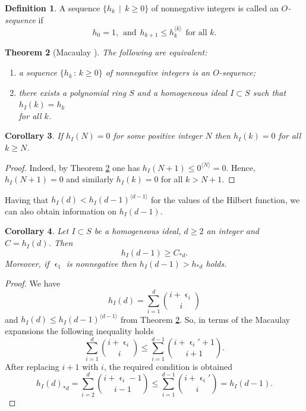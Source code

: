\documentclass[a4paper,11pt,english,german]{amsart}
\DeclareMathOperator{\eps}{\epsilon}
\newtheorem{thm}{Theorem}[section]
\newtheorem{cor}[thm]{Corollary}
\theoremstyle{definition}
\newtheorem{Def}[thm]{Definition}
\begin{document}
\begin{Def}
A sequence $\{h_k \, \mid\,k\geqslant 0\}$ of nonnegative integers is called an \emph{$O$-sequence} if 
\begin{equation*}
	h_0=1,\hspace{5pt}\text{and}\hspace{5pt} h_{k+1}\leqslant h_k^{\langle k\rangle}\hspace{5pt}\text{for all }k.
\end{equation*}	
\end{Def}


\begin{thm}[Macaulay \cite{macaulay1927some}] \label{macaulay}
	The following are equivalent:
	\begin{enumerate}
		\item[\emph{(1)}] a sequence $\{h_k \,:\,k\geqslant 0\}$ of nonnegative integers is an $O$-sequence;
		\item[\emph{(2)}] there exists a polynomial ring $S$ and a homogeneous ideal $I\subset S$ such that $h_I(k)=h_k$ \\for all $k$.
	\end{enumerate}
\end{thm}
\begin{cor}\label{macaulay_zero}
If $h_I(N)=0$ for some positive integer $N$ then $h_I(k)=0$ for all $k\geqslant N$.	
\end{cor}
\begin{proof}
	Indeed, by Theorem \ref{macaulay} one has $h_I(N+1)\leqslant 0^{\langle N\rangle}=0$. Hence, $h_I(N+1)=0$ and similarly $h_I(k)=0$ for all $k>N+1$.
\end{proof}


Having that $h_I(d)<h_I(d-1)^{\langle d-1\rangle }$ for the values of the Hilbert function, we can also obtain information on $h_I(d-1)$.

\begin{cor}\label{lower_bound}
	Let $I\subset S$ be a homogeneous ideal, $d\geqslant 2$ an integer and $C=h_I(d)$. Then
	\begin{equation*}
		h_I(d-1)\geqslant C_{\ast d}.
	\end{equation*}
	Moreover, if $\eps_1$ is nonnegative then $h_I(d-1)>h_{\ast d}$ holds.
\end{cor}
\begin{proof}
We have 
$$h_I(d)=\sum\limits_{i=1}^d \binom{i+\eps_i}{i}$$
 and $h_I(d)\leqslant h_I(d-1)^{\langle d-1\rangle}$ from Theorem \ref{macaulay}. So, in terms of the Macaulay expansions the following inequality holds
\begin{equation*}
	\sum\limits_{i=1}^d \binom{i+\eps_i}{i} \leqslant \sum\limits_{i=1}^{d-1}\binom{i+\eps_i'+1}{i+1}.
\end{equation*}
After replacing $i+1$ with $i$, the required condition is obtained
\begin{equation*}
	h_I(d)_{\ast d}=\sum\limits_{i=2}^d \binom{i+\eps_i-1}{i-1} \leqslant \sum\limits_{i=1}^{d-1}\binom{i+\eps_i'}{i}=h_I(d-1).
\end{equation*}	
\end{proof}
\end{document}
